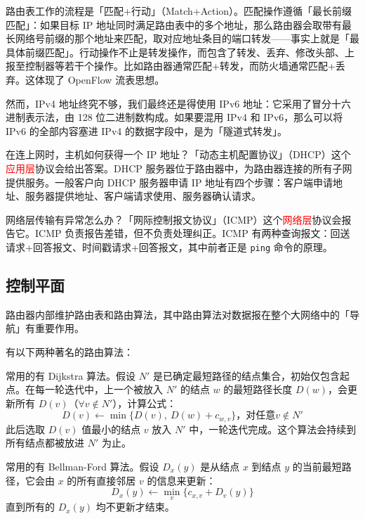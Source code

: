 \documentclass[UTF8]{ctexart}
\newcommand\Concept[1]{\textcolor{cyan!70!black}{#1}}
\begin{document}
路由表工作的流程是「匹配+行动」（Match+Action）。匹配操作遵循「最长前缀匹配」：如果目标 IP 地址同时满足路由表中的多个地址，那么路由器会取带有最长网络号前缀的那个地址来匹配，取对应地址条目的端口转发——事实上就是「最具体前缀匹配」。行动操作不止是转发操作，而包含了转发、丢弃、修改头部、上报至控制器等若干个操作。比如路由器通常匹配+转发，而防火墙通常匹配+丢弃。这体现了 OpenFlow 流表思想。

然而，IPv4 地址终究不够，我们最终还是得使用 IPv6 地址：它采用了冒分十六进制表示法，由 128 位二进制数构成。如果要混用 IPv4 和 IPv6，那么可以将 IPv6 的全部内容塞进 IPv4 的数据字段中，是为「隧道式转发」。

在连上网时，主机如何获得一个 IP 地址？\Concept{「动态主机配置协议」（DHCP）}这个\textcolor{red}{应用层}协议会给出答案。DHCP 服务器位于路由器中，为路由器连接的所有子网提供服务。一般客户向 DHCP 服务器申请 IP 地址有四个步骤：客户端申请地址、服务器提供地址、客户端请求使用、服务器确认请求。

网络层传输有异常怎么办？\Concept{「网际控制报文协议」（ICMP）}这个\textcolor{red}{网络层}协议会报告它。ICMP 负责报告差错，但不负责处理纠正。ICMP 有两种查询报文：回送请求+回答报文、时间戳请求+回答报文，其中前者正是 \verb!ping! 命令的原理。

\subsection{控制平面}
路由器内部维护路由表和路由算法，其中路由算法对数据报在整个大网络中的「导航」有重要作用。

有以下两种著名的路由算法：
\begin{description}[itemsep=0pt,parsep=0pt]
  \item[链路状态算法(LS)] 常用的有 Dijkstra 算法。假设 $N'$ 是已确定最短路径的结点集合，初始仅包含起点。在每一轮迭代中，上一个被放入 $N'$ 的结点 $w$ 的最短路径长度 $D(w)$，会更新所有 $D(v)$（$\forall v\notin N'$），计算公式：
      \begin{equation*}
            D(v)\gets \min\{D(v),\  D(w)+c_{w,v}\}\text{，对任意} v\notin N'
      \end{equation*}
      此后选取 $D(v)$ 值最小的结点 $v$ 放入 $N'$ 中，一轮迭代完成。这个算法会持续到所有结点都被放进 $N'$ 为止。
  \item[距离向量算法(DV)] 常用的有 Bellman-Ford 算法。假设 $D_x(y)$ 是从结点 $x$ 到结点 $y$ 的当前最短路径，它会由 $x$ 的所有直接邻居 $v$ 的信息来更新：
      \begin{equation*}
            D_x(y)\gets \min\limits_{v} \{c_{x,v} + D_v(y)\}
      \end{equation*}
      直到所有的 $D_x(y)$ 均不更新才结束。
\end{description}
\end{document}
